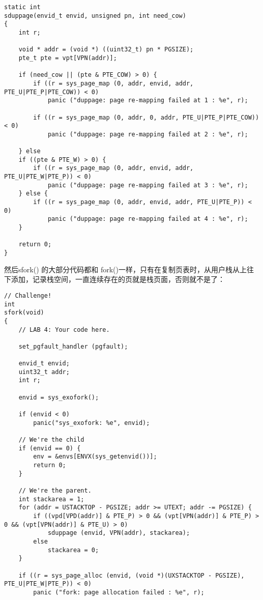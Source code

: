 \documentclass{article}
\newcommand{\funcname}[1]{{\ttfamily \small #1}}
\begin{document}
\begin{CJK*}{UTF8}{gkai}
\begin{lstlisting}[style=ccode, title={\scriptsize \ttfamily \bfseries lib/fork.c: sduppage()}]
static int
sduppage(envid_t envid, unsigned pn, int need_cow)
{
    int r;

    void * addr = (void *) ((uint32_t) pn * PGSIZE);
    pte_t pte = vpt[VPN(addr)];

    if (need_cow || (pte & PTE_COW) > 0) {
        if ((r = sys_page_map (0, addr, envid, addr, PTE_U|PTE_P|PTE_COW)) < 0)
            panic ("duppage: page re-mapping failed at 1 : %e", r);

        if ((r = sys_page_map (0, addr, 0, addr, PTE_U|PTE_P|PTE_COW)) < 0)
            panic ("duppage: page re-mapping failed at 2 : %e", r);

    } else
    if ((pte & PTE_W) > 0) {
        if ((r = sys_page_map (0, addr, envid, addr, PTE_U|PTE_W|PTE_P)) < 0)
            panic ("duppage: page re-mapping failed at 3 : %e", r);
    } else {
        if ((r = sys_page_map (0, addr, envid, addr, PTE_U|PTE_P)) < 0)
            panic ("duppage: page re-mapping failed at 4 : %e", r);
    }
     
    return 0;
}
\end{lstlisting}

然后\funcname{sfork()} 的大部分代码都和 \funcname{fork()}一样，只有在复制页表时，从用户栈从上往下添加，记录栈空间，一直连续存在的页就是栈页面，否则就不是了：

\begin{lstlisting}[style=ccode, title={\scriptsize \ttfamily \bfseries lib/fork.c: sfork()}]
// Challenge!
int
sfork(void)
{
    // LAB 4: Your code here.

    set_pgfault_handler (pgfault);

    envid_t envid;
    uint32_t addr;
    int r;

    envid = sys_exofork();
	
    if (envid < 0)
        panic("sys_exofork: %e", envid);

    // We're the child
    if (envid == 0) {
        env = &envs[ENVX(sys_getenvid())];
        return 0;
    }

	// We're the parent.
    int stackarea = 1;
    for (addr = USTACKTOP - PGSIZE; addr >= UTEXT; addr -= PGSIZE) {
        if ((vpd[VPD(addr)] & PTE_P) > 0 && (vpt[VPN(addr)] & PTE_P) > 0 && (vpt[VPN(addr)] & PTE_U) > 0)
            sduppage (envid, VPN(addr), stackarea);
        else
            stackarea = 0;
    }

    if ((r = sys_page_alloc (envid, (void *)(UXSTACKTOP - PGSIZE), PTE_U|PTE_W|PTE_P)) < 0)
        panic ("fork: page allocation failed : %e", r);


\end{lstlisting}
\end{CJK*}
\end{document}
